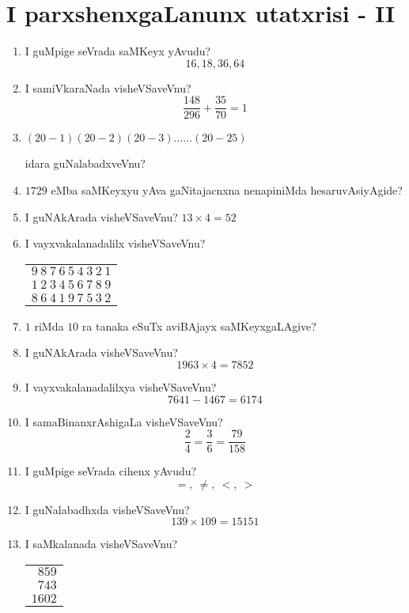 \chapter{I parxshenxgaLanunx utatxrisi - {\rm II}}

\begin{enumerate}
  \renewcommand{\labelenumi}{(\rm\theenumi)}
  \itemsep=1pt
\item I guMpige seVrada saMKeyx yAvudu?
$$
16,18,36,64
$$

\item I samiVkaraNada visheVSaveVnu?
$$
\dfrac{148}{296}+\dfrac{35}{70}=1
$$

\item $(20-1)(20-2)(20-3)\ldots\ldots(20-25)$

idara guNalabadxveVnu?

\item $1729$ eMba saMKeyxyu yAva gaNitajacnxna nenapiniMda hesaruvAsiyAgide?

\item I guNAkArada visheVSaveVnu? $13\times 4=52$

\item I vayxvakalanadalilx visheVSaveVnu?
\begin{center}
\begin{tabular}{l}
$9~8~7~6~5~4~3~2~1$\\
$1~2~3~4~5~6~7~8~9$\\
\hline
$8~6~4~1~9~7~5~3~2$
\end{tabular}
\end{center}

\item $1$ riMda $10$ ra tanaka eSuTx aviBAjayx saMKeyxgaLAgive?

\item I guNAkArada visheVSaveVnu?
$$
1963\times 4=7852
$$

\item I vayxvakalanadalilxya visheVSaveVnu?
$$
7641-1467=6174
$$

\item I samaBinanxrAshigaLa visheVSaveVnu?
$$
\dfrac{2}{4}=\dfrac{3}{6}=\dfrac{79}{158}
$$

\item I guMpige seVrada cihenx yAvudu?
$$
=, ~ \neq, ~ <, ~ >
$$

\item I guNalabadhxda visheVSaveVnu?
$$
139\times 109=15151
$$

\item I saMkalanada visheVSaveVnu?
\begin{center}
\begin{tabular}{r}
$859$\\
$743$\\
\hline
$1602$
\end{tabular}
\end{center}


\end{enumerate}
